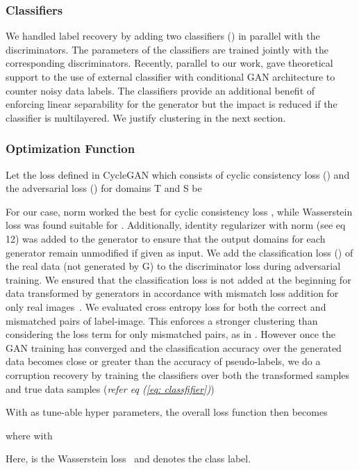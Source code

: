 \documentclass[10pt,twocolumn,letterpaper]{article}
\begin{document}
\subsubsection{Classifiers}
 We handled label recovery by adding two classifiers () in parallel with the discriminators. The parameters of the classifiers are trained jointly with the corresponding discriminators. Recently, parallel to our work, \cite{robustGAN} gave theoretical support to the use of external classifier with conditional GAN architecture to counter noisy data labels. The classifiers provide an additional benefit of enforcing linear separability for the generator but the impact is reduced if the classifier is multilayered. We justify clustering in the next section. 

\subsubsection{Optimization Function}
Let the loss defined in CycleGAN which consists of cyclic consistency loss () and the adversarial loss () for domains T and S be 

For our case,  norm worked the best for cyclic consistency loss\cite{cyclegan} , while Wasserstein loss \cite{arjovsky2017wasserstein} was found suitable for . Additionally, identity regularizer with  norm (see eq 12) was added to the generator to ensure that the output domains for each generator remain unmodified if given as input. We add the classification loss () of the real data (not generated by G) to the discriminator loss during adversarial training. We ensured that the classification loss is not added at the beginning for data transformed by generators in accordance with mismatch loss addition for only real images~\cite{conGAN}. We evaluated cross entropy loss for both the correct and mismatched pairs of label-image. This enforces a stronger clustering than considering the loss term for only mismatched pairs, as in \cite{conGAN}. However once the GAN training has converged and the classification accuracy over the generated data becomes close or greater than the accuracy of pseudo-labels, we do a corruption recovery by training the classifiers over both the transformed samples  and true data samples  (\textit{refer eq (\ref{eq: classfifier})})

With  as tune-able hyper parameters, the overall loss function then becomes

where  with


Here,  is the Wasserstein loss~\cite{arjovsky2017wasserstein} and  denotes the class label.
\end{document}
